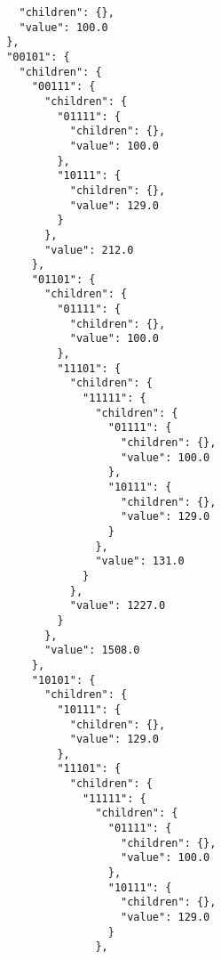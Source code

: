 \documentclass{article}
\begin{document}
\begin{listing}
\begin{verbatim}
                      "children": {},
                      "value": 100.0
                    },
                    "00101": {
                      "children": {
                        "00111": {
                          "children": {
                            "01111": {
                              "children": {},
                              "value": 100.0
                            },
                            "10111": {
                              "children": {},
                              "value": 129.0
                            }
                          },
                          "value": 212.0
                        },
                        "01101": {
                          "children": {
                            "01111": {
                              "children": {},
                              "value": 100.0
                            },
                            "11101": {
                              "children": {
                                "11111": {
                                  "children": {
                                    "01111": {
                                      "children": {},
                                      "value": 100.0
                                    },
                                    "10111": {
                                      "children": {},
                                      "value": 129.0
                                    }
                                  },
                                  "value": 131.0
                                }
                              },
                              "value": 1227.0
                            }
                          },
                          "value": 1508.0
                        },
                        "10101": {
                          "children": {
                            "10111": {
                              "children": {},
                              "value": 129.0
                            },
                            "11101": {
                              "children": {
                                "11111": {
                                  "children": {
                                    "01111": {
                                      "children": {},
                                      "value": 100.0
                                    },
                                    "10111": {
                                      "children": {},
                                      "value": 129.0
                                    }
                                  },

\end{verbatim}
\end{listing}
\end{document}

